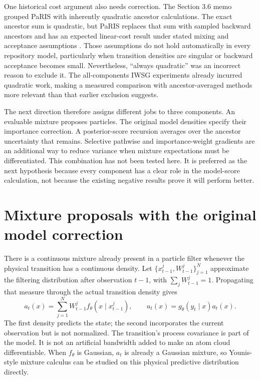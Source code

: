 \documentclass[11pt]{article}
\begin{document}
One historical cost argument also needs correction. The Section 3.6 memo
grouped PaRIS with inherently quadratic ancestor calculations. The exact
ancestor sum is quadratic, but PaRIS replaces that sum with sampled backward
ancestors and has an expected linear-cost result under stated mixing and
acceptance assumptions \citep[Section 3.1, Algorithm 2; Section 3.2.4,
Theorem 10]{olsson2014paris}. Those assumptions do not hold automatically in
every repository model, particularly when transition densities are singular
or backward acceptance becomes small. Nevertheless, ``always quadratic''
was an incorrect reason to exclude it. The all-components IWSG experiments
already incurred quadratic work, making a measured comparison with
ancestor-averaged methods more relevant than that earlier exclusion suggests.

The next direction therefore assigns different jobs to three components.
An evaluable mixture proposes particles. The original model densities specify
their importance correction. A posterior-score recursion averages over the
ancestor uncertainty that remains. Selective pathwise and importance-weight
gradients are an additional way to reduce variance when mixture expectations
must be differentiated. This combination has not been tested here. It is
preferred as the next hypothesis because every component has a clear role in
the model-score calculation, not because the existing negative results prove
it will perform better.


\section{Mixture proposals with the original model correction}
\label{sec:model-mixtures}

There is a continuous mixture already present in a particle filter whenever
the physical transition has a continuous density. Let
$\{x_{t-1}^j,W_{t-1}^j\}_{j=1}^N$ approximate the filtering distribution
after observation $t-1$, with $\sum_jW_{t-1}^j=1$. Propagating that measure
through the actual transition density gives
\begin{equation}
 a_t(x)=\sum_{j=1}^N W_{t-1}^j f_\theta(x\mid x_{t-1}^j),\qquad
 u_t(x)=g_\theta(y_t\mid x)a_t(x).
 \label{eq:physical-predictive-mixture}
\end{equation}
The first density predicts the state; the second incorporates the current
observation but is not normalized. The transition's process covariance is
part of the model. It is not an artificial bandwidth added to make an atom
cloud differentiable. When $f_\theta$ is Gaussian, $a_t$ is already a Gaussian
mixture, so Younis-style mixture calculus can be studied on this physical
predictive distribution directly.
\end{document}
